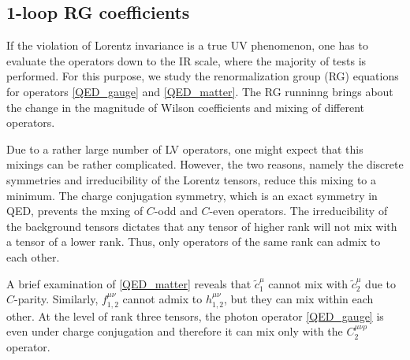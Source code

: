 \documentclass[12pt,preprintnumbers,nofootinbib]{revtex4}
\newcommand{\wt}{\widetilde}
\newcommand{\ov}{\overline}
\begin{document}
\subsection{1-loop RG coefficients}

	If the violation of Lorentz invariance is a true UV phenomenon, one 
has to evaluate the operators down to the IR scale, where the 
majority of tests is performed. For this purpose, we study
	the renormalization group (RG) equations for operators
	\eqref{QED_gauge} and \eqref{QED_matter}.
	The RG runninng brings about the change in 
    the magnitude of Wilson coefficients 
    and mixing of different operators.

	Due to a rather large number of LV operators, one might expect that 
    this  mixings can be rather complicated.
	However, the two reasons, namely the discrete symmetries and irreducibility
	of the Lorentz tensors, reduce this mixing to
	a minimum.
	The charge conjugation symmetry, which is an exact symmetry in QED,
	prevents the mxing of  $C$-odd and $C$-even operators.
	The irreducibility of the background tensors dictates that any tensor of
	higher rank will not mix with a tensor of a lower rank.
	Thus, only operators of the same rank can admix to each other.
	
	A brief examination of \eqref{QED_matter} reveals that
	$ \wt{c}_1^\mu $ cannot mix with $ \wt{c}_2^\mu $ due to $C$-parity.
	Similarly, $ f_{1,2}^{\mu\nu} $ cannot admix to $ h_{1,2}^{\mu\nu} $,
	but they can mix within each other.
	At the level of rank three tensors, the photon
	operator \eqref{QED_gauge} is even under charge conjugation and
	therefore it can  mix only with the $ C_2^{\mu\nu\rho} $ operator.
		
	
\end{document}
